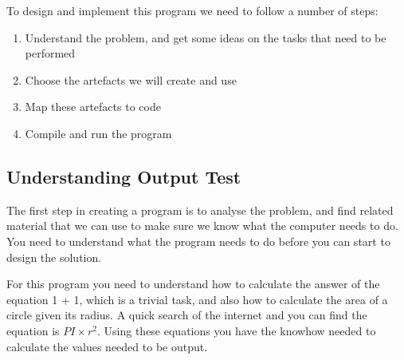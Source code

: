 To design and implement this program we need to follow a number of steps:

\begin{enumerate}
  \item Understand the problem, and get some ideas on the tasks that need to be performed
  \item Choose the artefacts we will create and use
  \item Map these artefacts to code
  \item Compile and run the program
\end{enumerate}




\clearpage
\subsection{Understanding Output Test} %
\label{sub:understanding_output_test}

The first step in creating a program is to analyse the problem, and find related material that we can use to make sure we know what the computer needs to do. You need to understand what the program needs to do before you can start to design the solution.

For this program you need to understand how to calculate the answer of the equation 1 + 1, which is a trivial task, and also how to calculate the area of a circle given its radius. A quick search of the internet and you can find the equation is $PI \times r^2$. Using these equations you have the knowhow needed to calculate the values needed to be output.

